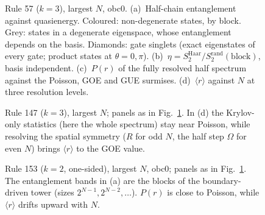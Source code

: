 \begin{figure}[p]
\centering
{}
\caption{Rule 57 ($k=3$), largest $N$, obc0. (a)~Half-chain entanglement against quasienergy. Coloured: non-degenerate states,
by block. Grey: states in a degenerate eigenspace, whose entanglement depends on the basis. Diamonds: gate singlets (exact
eigenstates of every gate; product states at $\theta=0,\pi$). (b)~$\eta=S_2^\mathrm{Haar}/S_2^\mathrm{rand}(\mathrm{block})$,
basis independent. (c)~$P(r)$ of the fully resolved half spectrum against the Poisson, GOE and GUE surmises. (d)~$\langle
r\rangle$ against $N$ at three resolution levels.}
\label{fig:rule57}
\end{figure}

\begin{figure}[p]
\centering
{}
\caption{Rule 147 ($k=3$), largest $N$; panels as in Fig.~\ref{fig:rule57}. In (d) the Krylov-only statistics (here the whole
spectrum) stay near Poisson, while resolving the spatial symmetry ($R$ for odd $N$, the half step $\Omega$ for even $N$)
brings $\langle r\rangle$ to the GOE value.}
\label{fig:rule147}
\end{figure}

\begin{figure}[p]
\centering
{}
\caption{Rule 153 ($k=2$, one-sided), largest $N$, obc0; panels as in Fig.~\ref{fig:rule57}. The entanglement bands in (a) are the
blocks of the boundary-driven tower (sizes $2^{N-1},2^{N-2},\ldots$). $P(r)$ is close to Poisson, while $\langle r\rangle$
drifts upward with $N$.}
\label{fig:rule153}
\end{figure}
